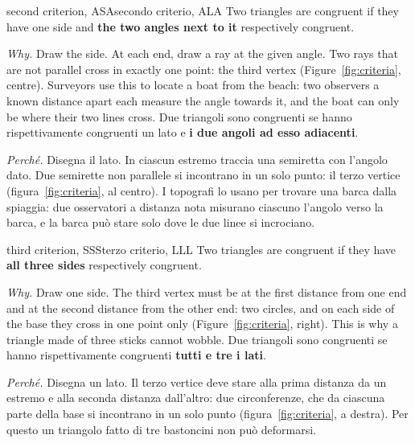 \begin{defn}{second criterion, ASA}{secondo criterio, ALA}
Two triangles are congruent if they have one side and \textbf{the two angles next to it} respectively congruent.

\emph{Why.} Draw the side. At each end, draw a ray at the given angle. Two rays that are not parallel cross in exactly one point: the third vertex (Figure~\ref{fig:criteria}, centre). Surveyors use this to locate a boat from the beach: two observers a known distance apart each measure the angle towards it, and the boat can only be where their two lines cross.
\tcblower
Due triangoli sono congruenti se hanno rispettivamente congruenti un lato e \textbf{i due angoli ad esso adiacenti}.

\emph{Perché.} Disegna il lato. In ciascun estremo traccia una semiretta con l'angolo dato. Due semirette non parallele si incontrano in un solo punto: il terzo vertice (figura~\ref{fig:criteria}, al centro). I topografi lo usano per trovare una barca dalla spiaggia: due osservatori a distanza nota misurano ciascuno l'angolo verso la barca, e la barca può stare solo dove le due linee si incrociano.
\end{defn}

\begin{defn}{third criterion, SSS}{terzo criterio, LLL}
Two triangles are congruent if they have \textbf{all three sides} respectively congruent.

\emph{Why.} Draw one side. The third vertex must be at the first distance from one end and at the second distance from the other end: two circles, and on each side of the base they cross in one point only (Figure~\ref{fig:criteria}, right). This is why a triangle made of three sticks cannot wobble.
\tcblower
Due triangoli sono congruenti se hanno rispettivamente congruenti \textbf{tutti e tre i lati}.

\emph{Perché.} Disegna un lato. Il terzo vertice deve stare alla prima distanza da un estremo e alla seconda distanza dall'altro: due circonferenze, che da ciascuna parte della base si incontrano in un solo punto (figura~\ref{fig:criteria}, a destra). Per questo un triangolo fatto di tre bastoncini non può deformarsi.
\end{defn}

